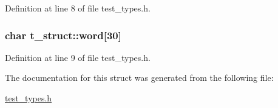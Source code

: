Definition at line 8 of file test\-\_\-types.\-h.

\hypertarget{structt__struct_ab5b290b572fc4036f1e5efc671098c7f}{
\subsubsection[{word}]{\setlength{\rightskip}{0pt plus 5cm}char t\-\_\-struct\-::word\mbox{[}30\mbox{]}}}\label{structt__struct_ab5b290b572fc4036f1e5efc671098c7f}


Definition at line 9 of file test\-\_\-types.\-h.



The documentation for this struct was generated from the following file\-:\begin{DoxyCompactItemize}
\item 
\hyperlink{test__types_8h}{test\-\_\-types.\-h}\end{DoxyCompactItemize}
